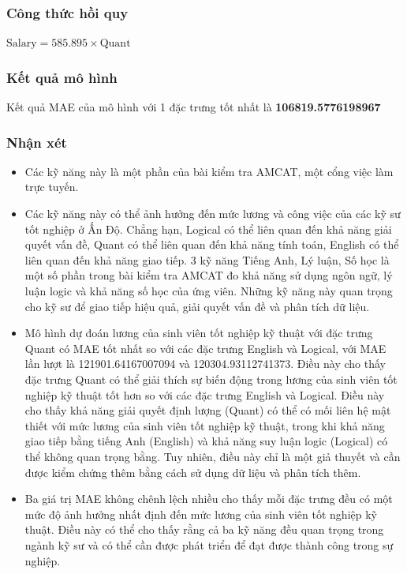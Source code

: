 \documentclass[]{article}
\begin{document}
\subsubsection{Công thức hồi quy}
$\text{Salary} = 585.895 \times \text{Quant}$
\subsubsection{Kết quả mô hình}
\begin{table}[!h]
  \centering
\end{table}
Kết quả MAE của mô hình với 1 đặc trưng tốt nhất là \textbf{106819.5776198967}

\subsubsection{Nhận xét}
\begin{itemize}
  \item Các kỹ năng này là một phần của bài kiểm tra AMCAT, một cổng việc làm trực tuyến. \cite{kaggleEngineeringGraduate}
  \item Các kỹ năng này có thể ảnh hưởng đến mức lương và công việc của các kỹ sư tốt nghiệp ở Ấn Độ. Chẳng hạn, Logical có thể liên quan đến khả năng giải quyết vấn đề, Quant có thể liên quan đến khả năng tính toán, English có thể liên quan đến khả năng giao tiếp. 3 kỹ năng Tiếng Anh, Lý luận, Số học là một số phần trong bài kiểm tra AMCAT đo khả năng sử dụng ngôn ngữ, lý luận logic và khả năng số học của ứng viên. Những kỹ năng này quan trọng cho kỹ sư để giao tiếp hiệu quả, giải quyết vấn đề và phân tích dữ liệu. 
  \item Mô hình dự đoán lương của sinh viên tốt nghiệp kỹ thuật với đặc trưng Quant có MAE tốt nhất so với các đặc trưng English và Logical, với MAE lần lượt là 121901.64167007094 và 120304.93112741373. Điều này cho thấy đặc trưng Quant có thể giải thích sự biến động trong lương của sinh viên tốt nghiệp kỹ thuật tốt hơn so với các đặc trưng English và Logical. Điều này cho thấy khả năng giải quyết định lượng (Quant) có thể có mối liên hệ mật thiết với mức lương của sinh viên tốt nghiệp kỹ thuật, trong khi khả năng giao tiếp bằng tiếng Anh (English) và khả năng suy luận logic (Logical) có thể không quan trọng bằng. Tuy nhiên, điều này chỉ là một giả thuyết và cần được kiểm chứng thêm bằng cách sử dụng dữ liệu và phân tích thêm.
  \item Ba giá trị MAE không chênh lệch nhiều cho thấy mỗi đặc trưng đều có một mức độ ảnh hưởng nhất định đến mức lương của sinh viên tốt nghiệp kỹ thuật. Điều này có thể cho thấy rằng cả ba kỹ năng đều quan trọng trong ngành kỹ sư và có thể cần được phát triển để đạt được thành công trong sự nghiệp.
\end{itemize}
  
\end{document}
